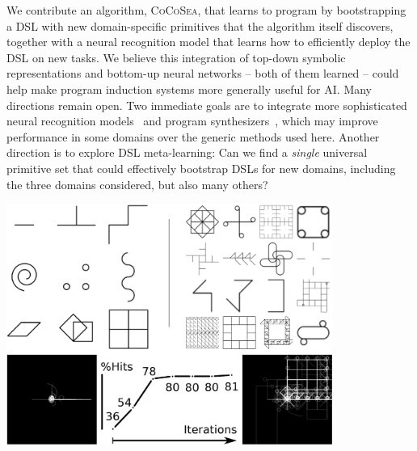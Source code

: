 \documentclass{article}
\newcommand{\systemEnding}{\textsc{CoCoSea}}
\begin{document}
\parbox{0.58\textwidth}{
We contribute an algorithm, \systemEnding, that learns to program by bootstrapping a DSL with new
domain-specific primitives that the algorithm itself discovers,
together with a neural recognition model that learns how to
efficiently deploy the DSL on new tasks. We believe this integration
of top-down symbolic representations and bottom-up neural networks --
both of them learned -- could help make program induction systems more
generally useful for AI. Many directions remain open. Two immediate
goals 
are to integrate more sophisticated neural recognition
models~\cite{devlin2017robustfill} and program
synthesizers~\cite{solar2008program}, which may improve performance in
some domains over the generic methods used here.
Another direction is to
explore DSL meta-learning: Can we find a \emph{single} universal
primitive set that could effectively bootstrap DSLs for new domains,
including the three domains considered,  but also many others?
}\hfill\begin{minipage}{0.4\textwidth}\centering
  \includegraphics[width=0.8\textwidth]{figures/geomCompiled.eps} 
  \label{geomCompiled}
\end{minipage}


{\small }
\end{document}
